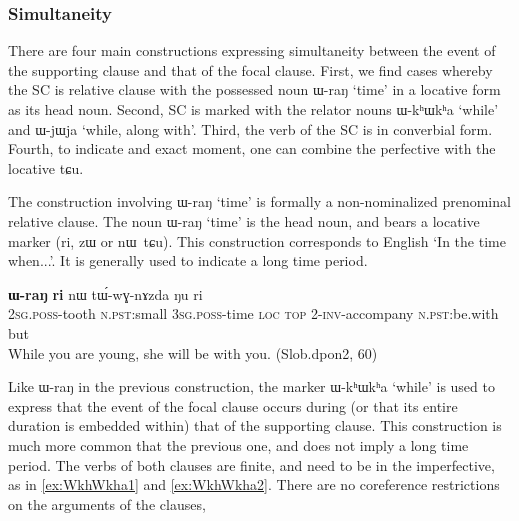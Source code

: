\documentclass[oldfontcommands,oneside,a4paper,11pt]{article}
\newcommand{\ipa}[1]{{\phon \mbox{#1}}} %
\begin{document}
	

 

\subsubsection{Simultaneity} \label{sec:simultaneity}





There are four main constructions  expressing simultaneity between the event of the supporting clause and that of the focal clause. First, we find cases whereby the SC is relative clause with the possessed noun \ipa{ɯ-raŋ} `time' in a locative form as its head noun. Second, SC is marked with  the relator nouns \ipa{ɯ-kʰɯkʰa} `while' and \ipa{ɯ-jɯja} `while, along with'.  Third, the verb of the SC is in  converbial form. Fourth, to indicate and exact moment, one can combine the perfective with the locative \ipa{tɕu}.


The construction involving \ipa{ɯ-raŋ} `time' is formally a non-nominalized prenominal relative clause.  The noun  \ipa{ɯ-raŋ} `time' is the head noun, and bears  a locative marker (\ipa{ri}, \ipa{zɯ} or \ipa{nɯ tɕu}). This construction corresponds to English `In the time when...'. It is generally used to indicate a long time period.

\begin{exe}
   \ex \label{ex:WraN2}
 \gll [\ipa{nɤ-ɕɣa}   	\ipa{xtɕi}]   	\textbf{\ipa{ɯ-raŋ}}   	\textbf{\ipa{ri}}   	\ipa{nɯ}   	\ipa{tɯ́-wɣ-nɤzda}   	\ipa{ŋu}   	\ipa{ri}   \\
 \textsc{2sg.poss}-tooth \textsc{n.pst}:small \textsc{3sg.poss}-time \textsc{loc} \textsc{top} 2-\textsc{inv}-accompany \textsc{n.pst}:be.with but \\
\glt While you are young, she will be with you. (Slob.dpon2, 60)
\end{exe}

Like \ipa{ɯ-raŋ} in the previous construction, the marker  \ipa{ɯ-kʰɯkʰa} `while'  is used to express  that the event of the focal clause occurs during (or that its entire duration is embedded within) that of the supporting clause. This construction is much more common that the previous one, and does not imply a long time period.  The verbs of both clauses are finite, and need to be in the imperfective, as in \ref{ex:WkhWkha1} and \ref{ex:WkhWkha2}. There are no coreference restrictions on the arguments of the clauses, 
\end{document}
